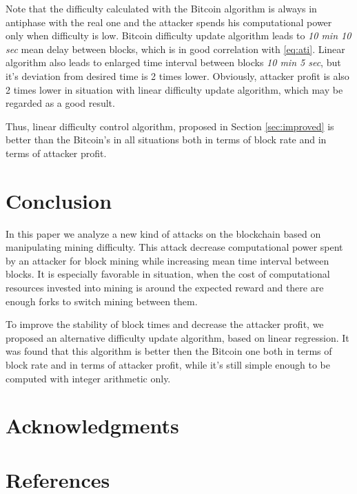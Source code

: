 \documentclass[number,preprint,review]{elsarticle}
\begin{document}
Note that the difficulty calculated with the Bitcoin algorithm is always in antiphase with the real one and the attacker spends his computational power only when difficulty is low.
Bitcoin difficulty update algorithm leads to \textit{10 min 10 sec} mean delay between blocks, which is in good correlation with \ref{eq:ati}.
Linear algorithm also leads to enlarged time interval between blocks \textit{10 min 5 sec}, but it's deviation from desired time is 2 times lower.
Obviously, attacker profit is also 2 times lower in situation with linear difficulty update algorithm, which may be regarded as a good result.

Thus, linear difficulty control algorithm, proposed in Section \ref{sec:improved} is better than the Bitcoin's in all situations both in terms of block rate and in terms of attacker profit.

\section{Conclusion}
\label{sec:concl}

In this paper we analyze a new kind of attacks on the blockchain based on manipulating mining difficulty.
This attack decrease computational power spent by an attacker for block mining while increasing mean time interval between blocks.
It is especially favorable in situation, when the cost of computational resources invested into mining is around the expected reward and there are enough forks to switch mining between them.

To improve the stability of block times and decrease the attacker profit, we proposed an alternative difficulty update algorithm, based on linear regression.
It was found that this algorithm is better then the Bitcoin one both in terms of block rate and in terms of attacker profit, while it's still simple enough to be computed with integer arithmetic only.

\section*{Acknowledgments}

\section*{References}



\end{document}
